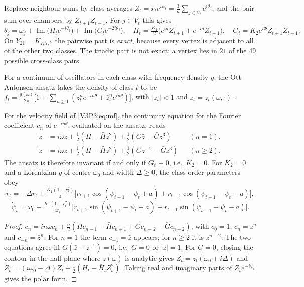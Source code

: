 Replace neighbour sums by class averages $Z_t=r_te^{i\psi_t}=\frac3n\sum_{j\in
V_t}e^{i\theta_j}$, and the pair sum over chambers by $Z_{t+1}Z_{t-1}$. For $j\in V_t$ this
gives
\begin{equation}\label{V3P3:eq:mf}
\dot\theta_j=\omega_j+\operatorname{Im}\bigl(H_te^{-i\theta_j}\bigr)+\operatorname{Im}\bigl(G_te^{-2i\theta_j}\bigr),
\quad H_t=\tfrac{K_1}2\bigl(e^{ia}Z_{t+1}+e^{-ia}Z_{t-1}\bigr),\quad G_t=K_2e^{i\Phi}Z_{t+1}Z_{t-1}.
\end{equation}
On $Y_{21}=K_{7,7,7}$ the pairwise part is \emph{exact}, because every vertex is adjacent to
all of the other two classes. The triadic part is not exact: a vertex lies in $21$ of the $49$
possible cross-class pairs.

For a continuum of oscillators in each class with frequency density $g$, the Ott--Antonsen
ansatz takes the density of class $t$ to be
$f_t=\frac{g(\omega)}{2\pi}\bigl[1+\sum_{n\ge1}(z_t^{n}e^{-in\theta}+\bar z_t^{n}e^{in\theta})\bigr]$,
with $|z_t|<1$ and $z_t=z_t(\omega,\cdot)$ \cite{OA08}.

\begin{proposition}\label{V3P3:prop:oa}
For the velocity field of \eqref{V3P3:eq:mf}, the continuity equation for the Fourier
coefficient $c_n$ of $e^{-in\theta}$, evaluated on the ansatz, reads
\begin{align*}
\dot z&=i\omega z+\tfrac12(H-\bar Hz^{2})+\tfrac12(G\bar z-\bar Gz^{3})&&(n=1),\\
\dot z&=i\omega z+\tfrac12(H-\bar Hz^{2})+\tfrac12(Gz^{-1}-\bar Gz^{3})&&(n\ge2).
\end{align*}
The ansatz is therefore invariant if and only if $G_t\equiv0$, i.e.\ $K_2=0$. For $K_2=0$ and
a Lorentzian $g$ of centre $\omega_0$ and width $\Delta\ge0$, the class order parameters obey
\[
\dot r_t=-\Delta r_t+\tfrac{K_1(1-r_t^{2})}4\bigl[r_{t+1}\cos(\psi_{t+1}-\psi_t+a)+r_{t-1}\cos(\psi_{t-1}-\psi_t-a)\bigr],
\]
\[
\dot\psi_t=\omega_0+\tfrac{K_1(1+r_t^{2})}{4r_t}\bigl[r_{t+1}\sin(\psi_{t+1}-\psi_t+a)+r_{t-1}\sin(\psi_{t-1}-\psi_t-a)\bigr].
\]
\end{proposition}

\begin{proof}
$\dot c_n=in\omega c_n+\frac n2(Hc_{n-1}-\bar Hc_{n+1}+Gc_{n-2}-\bar Gc_{n+2})$, with
$c_0=1$, $c_n=z^{n}$ and $c_{-n}=\bar z^{n}$. For $n=1$ the term $c_{-1}=\bar z$ appears; for
$n\ge2$ it is $z^{n-2}$. The two equations agree iff $G(\bar z-z^{-1})=0$, i.e.\ $G=0$ or
$|z|=1$. For $G=0$, closing the contour in the half plane where $z(\omega)$ is analytic gives
$Z_t=z_t(\omega_0+i\Delta)$ and $\dot Z_t=(i\omega_0-\Delta)Z_t+\frac12(H_t-\bar H_tZ_t^{2})$.
Taking real and imaginary parts of $\dot Z_te^{-i\psi_t}$ gives the polar form.
\end{proof}

